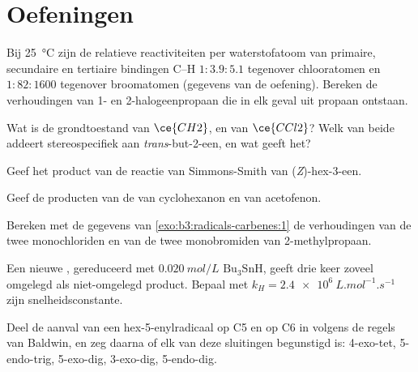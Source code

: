 \section{Oefeningen}

\begin{exercise}[$\star$]\label{exo:b3:radicals-carbenes:1}
Bij \qty{25}{\celsius} zijn de relatieve reactiviteiten per waterstofatoom van primaire,
secundaire en tertiaire bindingen C--H $1 : 3.9 : 5.1$ tegenover chlooratomen en $1 : 82 : 1600$ tegenover
broomatomen (gegevens van de oefening). Bereken de verhoudingen van 1- en
2-halogeenpropaan die in elk geval uit propaan ontstaan.
\end{exercise}

\begin{exercise}[$\star$]\label{exo:b3:radicals-carbenes:2}
Wat is de grondtoestand van $\ce{CH2}$, en van $\ce{CCl2}$? Welk van beide addeert stereospecifiek aan
\textit{trans}-but-2-een, en wat geeft het?
\end{exercise}

\begin{exercise}[$\star$]\label{exo:b3:radicals-carbenes:3}
Geef het product van de reactie van Simmons-Smith van (\textit{Z})-hex-3-een.
\end{exercise}

\begin{exercise}[$\star$]\label{exo:b3:radicals-carbenes:4}
Geef de producten van de  van cyclohexanon en van
acetofenon.
\end{exercise}

\begin{exercise}[$\star\star$]\label{exo:b3:radicals-carbenes:5}
Bereken met de gegevens van \cref{exo:b3:radicals-carbenes:1} de
verhoudingen van de twee monochloriden en van de twee monobromiden van
2-methylpropaan.
\end{exercise}

\begin{exercise}[$\star\star$]\label{exo:b3:radicals-carbenes:6}
Een nieuwe , gereduceerd met $\qty{0.020}{mol/L}$ $\mathrm{Bu_3SnH}$, geeft drie keer zoveel omgelegd
als niet-omgelegd product. Bepaal met $k_H = \qty{2.4e6}{L.mol^{-1}.s^{-1}}$ zijn snelheidsconstante.
\end{exercise}

\begin{exercise}[$\star\star$]\label{exo:b3:radicals-carbenes:7}
Deel de aanval van een hex-5-enylradicaal op C5 en op C6 in volgens de
regels van Baldwin, en zeg daarna of elk van deze sluitingen begunstigd
is: 4-exo-tet, 5-endo-trig, 5-exo-dig, 3-exo-dig, 5-endo-dig.
\end{exercise}

